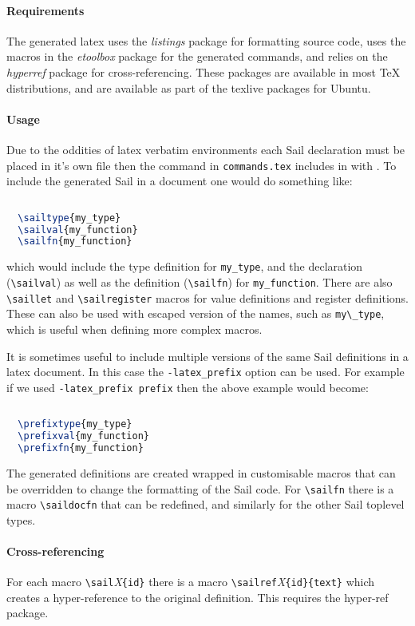 \paragraph{Requirements} The generated latex uses the \emph{listings} package for formatting
source code, uses the macros in the \emph{etoolbox} package for the
generated commands, and relies on the \emph{hyperref} package for
cross-referencing. These packages are available in most TeX
distributions, and are available as part of the texlive packages for
Ubuntu.

\paragraph{Usage} Due to the oddities of latex verbatim environments each Sail
declaration must be placed in it's own file then the command in
\verb+commands.tex+ includes in with \verb++. To
include the generated Sail in a document one would do something like:
\begin{lstlisting}[language=TeX]
  
  \sailtype{my_type}
  \sailval{my_function}
  \sailfn{my_function}
\end{lstlisting}
which would include the type definition for \verb+my_type+, and the
declaration (\verb+\sailval+) as well as the definition
(\verb+\sailfn+) for \verb+my_function+.  There are also
\verb+\saillet+ and \verb+\sailregister+ macros for value definitions
and register definitions.  These can also be used with escaped version
of the names, such as \verb+my\_type+, which is useful when defining
more complex macros.

It is sometimes useful to include multiple versions of the same Sail
definitions in a latex document. In this case the \verb+-latex_prefix+
option can be used. For example if we used \verb+-latex_prefix prefix+
then the above example would become:
\begin{lstlisting}[language=TeX]
  
  \prefixtype{my_type}
  \prefixval{my_function}
  \prefixfn{my_function}
\end{lstlisting}

The generated definitions are created wrapped in customisable macros
that can be overridden to change the formatting of the Sail code. For
\verb+\sailfn+ there is a macro \verb+\saildocfn+ that can be redefined,
and similarly for the other Sail toplevel types.

\paragraph{Cross-referencing} For each macro \verb+\sail+\emph{X}\verb+{id}+ there is a macro
\verb+\sailref+\emph{X}\verb+{id}{text}+ which creates a
hyper-reference to the original definition. This requires the
hyper-ref package.

